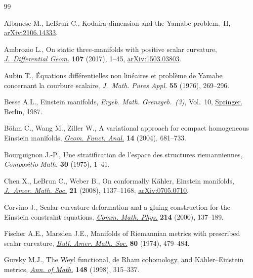\begin{thebibliography}{99}
\footnotesize\itemsep=0pt

Albanese M., LeBrun C., Kodaira dimension and the {Y}amabe problem,~{II},
 \href{https://arxiv.org/abs/2106.14333}{arXiv:2106.14333}.

Ambrozio L., On static three-manifolds with positive scalar curvature,
 \href{https://doi.org/10.4310/jdg/1505268028}{\textit{J.~Differential Geom.}} \textbf{107} (2017), 1--45,
 \href{https://arxiv.org/abs/1503.03803}{arXiv:1503.03803}.

Aubin T., \'Equations diff\'erentielles non lin\'eaires et probl\`eme de
 {Y}amabe concernant la courbure scalaire, \textit{J.~Math. Pures Appl.}
 \textbf{55} (1976), 269--296.

Besse A.L., Einstein manifolds, \textit{Ergeb. Math. Grenzgeb.~(3)}, Vol.~10,
 \href{https://doi.org/10.1007/978-3-540-74311-8}{Springer}, Berlin, 1987.

B\"ohm C., Wang M., Ziller W., A variational approach for compact homogeneous
 {E}instein manifolds, \href{https://doi.org/10.1007/s00039-004-0471-x}{\textit{Geom. Funct. Anal.}} \textbf{14} (2004),
 681--733.

Bourguignon J.-P., Une stratification de l'espace des structures riemanniennes,
 \textit{Compositio Math.} \textbf{30} (1975), 1--41.

Chen X., LeBrun C., Weber B., On conformally {K}\"ahler, {E}instein manifolds,
 \href{https://doi.org/10.1090/S0894-0347-08-00594-8}{\textit{J.~Amer. Math. Soc.}} \textbf{21} (2008), 1137--1168,
 \href{https://arxiv.org/abs/0705.0710}{arXiv:0705.0710}.

Corvino J., Scalar curvature deformation and a gluing construction for the
 {E}instein constraint equations, \href{https://doi.org/10.1007/PL00005533}{\textit{Comm. Math. Phys.}} \textbf{214}
 (2000), 137--189.

Fischer A.E., Marsden J.E., Manifolds of {R}iemannian metrics with prescribed
 scalar curvature, \href{https://doi.org/10.1090/S0002-9904-1974-13457-9}{\textit{Bull. Amer. Math. Soc.}} \textbf{80} (1974),
 479--484.

Gursky M.J., The {W}eyl functional, de {R}ham cohomology, and
 {K}\"ahler--{E}instein metrics, \href{https://doi.org/10.2307/120996}{\textit{Ann. of Math.}} \textbf{148} (1998),
 315--337.


\end{thebibliography}
